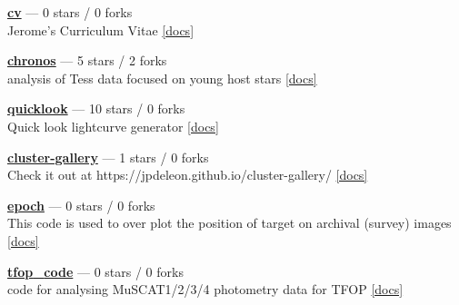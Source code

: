 \item \href{https://github.com/jpdeleon/cv}{{\bf cv}} --- 0 stars / 0 forks \\
Jerome's Curriculum Vitae \href{https://raw.githubusercontent.com/jpdeleon/cv/main-pdf/tex/cv_pubs.pdf}{[docs]}

\item \href{https://github.com/jpdeleon/chronos}{{\bf chronos}} --- 5 stars / 2 forks \\
analysis of Tess data focused on young host stars \href{None}{[docs]}

\item \href{https://github.com/jpdeleon/quicklook}{{\bf quicklook}} --- 10 stars / 0 forks \\
Quick look lightcurve generator \href{None}{[docs]}

\item \href{https://github.com/jpdeleon/cluster-gallery}{{\bf cluster-gallery}} --- 1 stars / 0 forks \\
Check it out at https://jpdeleon.github.io/cluster-gallery/ \href{None}{[docs]}

\item \href{https://github.com/jpdeleon/epoch}{{\bf epoch}} --- 0 stars / 0 forks \\
This code is used to over plot the position of target on archival (survey) images \href{None}{[docs]}

\item \href{https://github.com/jpdeleon/tfop_code}{{\bf tfop{\_}code}} --- 0 stars / 0 forks \\
code for analysing MuSCAT1/2/3/4 photometry data for TFOP \href{None}{[docs]}